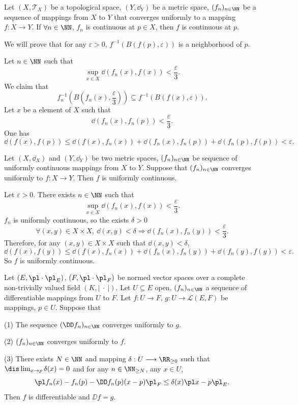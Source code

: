 \begin{theoremenv}
    Let $(X,\mathscr{T}_X)$ be a topological space, $(Y,\dd_{Y})$ be a metric space, $(f_n)_{n\in\NN}$ be a sequence of mappings from $X$ to $Y$ that converges uniformly to a mapping $f:X\longrightarrow Y$. If $\forall n\in \NN$, $f_n$ is continuous at $p\in X$, then $f$ is continuous at $p$.
\end{theoremenv}
\begin{proofenv}
    We will prove that for any $\varepsilon>0$, $f^{-1}(B(f(p),\varepsilon))$ is a neighborhood of $p$.

    Let $n\in\NN$ such that
    $$ \sup_{x\in X}\dd(f_n(x),f(x))<\frac{\varepsilon}{3}.$$
    We claim that 
    $$ f_n^{-1}(B(f_n(x),\frac{\varepsilon}{3}))\subseteq f^{-1}(B(f(x),\varepsilon)).$$
    Let $x$ be a element of $X$ such that 
    $$ \dd (f_n(x),f_n(p))<\frac{\varepsilon}{3}.$$
    One has
    $$ \dd(f(x),f(p))\le \dd(f(x),f_n(x))+\dd(f_n(x),f_n(p))+\dd(f_n(p),f(p))<\varepsilon.$$
\end{proofenv}
\begin{theoremenv}
    Let $(X,\dd_X)$ and $(Y,\dd_Y)$ be two metric spaces, $(f_n)_{n\in\NN}$ be sequence of uniformly continuous mappings from $X$ to $Y$. Suppose that $(f_n)_{n\in\NN}$ converges uniformly to $f:X\longrightarrow Y$. Then $f$ is uniformly continuous.
\end{theoremenv}
\begin{proofenv}
    Let $\varepsilon>0$. There exists $n\in \NN$ such that 
    $$ \sup_{x\in X}\dd(f_n(x),f(x))<\frac{\varepsilon}{3}.$$
    $f_n$ is uniformly continuous, so the exists $\delta>0$
    $$ \forall (x,y)\in X\times X,\ \dd(x,y)<\delta\Rightarrow \dd(f_n(x),f_n(y))<\frac{\varepsilon}{3}.$$
    Therefore, for any $(x,y)\in X\times X$ such that $\dd(x,y)<\delta$,
    $$ \dd(f(x),f(y))\le \dd(f(x),f_n(x))+\dd(f_n(x),f_n(y))+\dd(f_n(y),f(y))<\varepsilon.$$
    So $f$ is uniformly continuous.
\end{proofenv}
\begin{theoremenv}
    Let $(E,\pl\cdot\pl_E)$, $(F,\pl\cdot\pl_F)$ be normed vector spaces over a complete non-trivially valued field $(K,\left| \ \cdot\ \right|)$. Let $U\subseteq E$ open, $(f_n)_{n\in\NN}$ a sequence of differentiable mappings from $U$ to $F$. Let $f: U\longrightarrow F$, $g:U\longrightarrow \mathscr{L}(E,F)$ be mappings, $p\in U$. Suppose that 

    (1) The sequence $(\DD f_n)_{n\in \NN}$ converges uniformly to $g$.

    (2) $(f_n)_{n\in\NN}$ converges uniformly to $f$.

    (3) There exists $N\in \NN$ and mapping $\delta: U\longrightarrow \RR_{\ge 0}$ such that $\dis \lim_{x\rightarrow p}\delta(x)=0$ and for any $n\in\NN_{\ge N}$, any $x\in U$,
    $$ \pl f_n(x)-f_n(p)-\DD f_n(p)(x-p)\pl_{F}\le \delta(x) \pl x-p\pl_E.$$
    Then $f$ is differentiable and $\DD f=g$.
\end{theoremenv}
